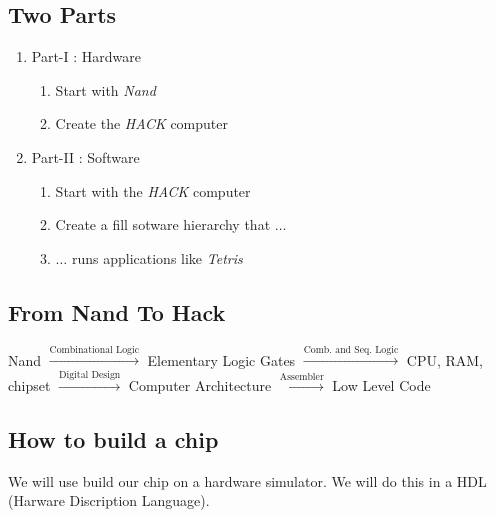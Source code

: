 \subsection{Two Parts}
\begin{enumerate}
    \item Part-I : Hardware
        \begin{enumerate}
            \item Start with \textit{Nand}
            \item Create the \textit{HACK} computer
        \end{enumerate}
    \item Part-II : Software
        \begin{enumerate}
            \item Start with the \textit{HACK} computer
            \item Create a fill sotware hierarchy that $\dots$
            \item $\dots$ runs applications like \textit{Tetris}
        \end{enumerate}
\end{enumerate}

\subsection{From Nand To Hack}

Nand
$\xrightarrow{\text{Combinational Logic}}$ Elementary Logic Gates
$\xrightarrow{\text{Comb. and Seq. Logic}}$ CPU, RAM, chipset
$\xrightarrow{\text{Digital Design}}$ Computer Architecture
$\xrightarrow{\text{Assembler}}$ Low Level Code

\subsection{How to build a chip}

We will use build our chip on a hardware simulator. We will do
this in a HDL (Harware Discription Language).
